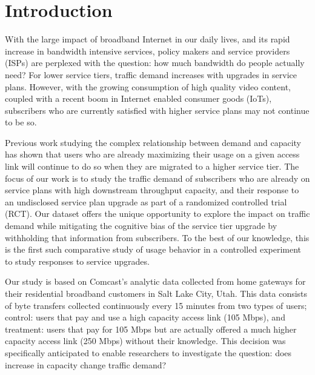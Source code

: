 \section{Introduction}\label{sec:introduction}

With the large impact of broadband Internet in our daily lives, and 
its rapid increase in bandwidth intensive services, policy makers and 
service providers (ISPs) are perplexed with the question: how much bandwidth do 
people actually need? For lower service tiers, traffic demand increases with 
upgrades in service plans. However, with the growing consumption of high 
quality video content, coupled with a recent boom in Internet enabled consumer 
goods (IoTs), subscribers who are currently satisfied with higher service plans 
may not continue to be so. 

Previous work studying the complex relationship between demand and capacity has 
shown that users who are already maximizing their usage on a given access link 
will continue to do so when they are migrated to a higher service tier. The 
focus of our work is to study the traffic demand of subscribers who are already 
on service plans with high downstream throughput capacity, and their response to 
an undisclosed service plan upgrade as part of a randomized controlled trial 
(RCT). Our dataset offers the unique opportunity to explore the impact on 
traffic demand while mitigating the cognitive bias of the service tier upgrade 
by withholding that information from subscribers. To the best of our knowledge, 
this is the first such comparative study of usage behavior in a controlled 
experiment to study responses to service upgrades.

Our study is based on Comcast's analytic data collected from home gateways for 
their residential broadband customers in Salt Lake City, Utah. This data 
consists of byte transfers collected continuously every 15 minutes from two 
types of users; control: users that pay and use a high capacity access link (105 
Mbps), and treatment: users that pay for 105 Mbps but are actually offered a 
much higher capacity access link (250 Mbps) without their knowledge. This 
decision was specifically anticipated to enable researchers to investigate the 
question: does increase in capacity change traffic demand?

